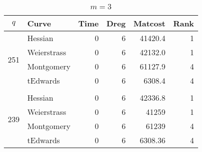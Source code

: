 
\begin{table}[!h]
\centering
\caption{$m=3$}
\label{tb:m=3}
\begin{tabular}{llrrrr}
\hline
\multicolumn{1}{|c|}{$q$}                    & \multicolumn{1}{l|}{Curve}       & \multicolumn{1}{l|}{Time} & \multicolumn{1}{l|}{Dreg} & \multicolumn{1}{l|}{Matcost} & \multicolumn{1}{l|}{Rank} \\ \hline
\multicolumn{1}{|l|}{\multirow{4}{*}{251}} & \multicolumn{1}{l|}{Hessian}     & \multicolumn{1}{r|}{0}    & \multicolumn{1}{r|}{6}    & \multicolumn{1}{r|}{41420.4} & \multicolumn{1}{r|}{1}    \\ \cline{2-6} 
\multicolumn{1}{|l|}{}                     & \multicolumn{1}{l|}{Weierstrass} & \multicolumn{1}{r|}{0}    & \multicolumn{1}{r|}{6}    & \multicolumn{1}{r|}{42132.0} & \multicolumn{1}{r|}{1}    \\ \cline{2-6} 
\multicolumn{1}{|l|}{}                     & \multicolumn{1}{l|}{Montgomery}  & \multicolumn{1}{r|}{0}    & \multicolumn{1}{r|}{6}    & \multicolumn{1}{r|}{61127.9} & \multicolumn{1}{r|}{4}    \\ \cline{2-6} 
\multicolumn{1}{|l|}{}                     & \multicolumn{1}{l|}{tEdwards}    & \multicolumn{1}{r|}{0}    & \multicolumn{1}{r|}{6}    & \multicolumn{1}{r|}{6308.4}  & \multicolumn{1}{r|}{4}    \\ \hline \vspace{-3mm}
                                           &                                  & \multicolumn{1}{l}{}      & \multicolumn{1}{l}{}      & \multicolumn{1}{l}{}         & \multicolumn{1}{l}{}      \\ \hline
\multicolumn{1}{|l|}{\multirow{4}{*}{239}} & \multicolumn{1}{l|}{Hessian}     & \multicolumn{1}{r|}{0}    & \multicolumn{1}{r|}{6}    & \multicolumn{1}{r|}{42336.8} & \multicolumn{1}{r|}{1}    \\ \cline{2-6} 
\multicolumn{1}{|l|}{}                     & \multicolumn{1}{l|}{Weierstrass} & \multicolumn{1}{r|}{0}    & \multicolumn{1}{r|}{6}    & \multicolumn{1}{r|}{41259}   & \multicolumn{1}{r|}{1}    \\ \cline{2-6} 
\multicolumn{1}{|l|}{}                     & \multicolumn{1}{l|}{Montgomery}  & \multicolumn{1}{r|}{0}    & \multicolumn{1}{r|}{6}    & \multicolumn{1}{r|}{61239}   & \multicolumn{1}{r|}{4}    \\ \cline{2-6} 
\multicolumn{1}{|l|}{}                     & \multicolumn{1}{l|}{tEdwards}    & \multicolumn{1}{r|}{0}    & \multicolumn{1}{r|}{6}    & \multicolumn{1}{r|}{6308.36} & \multicolumn{1}{r|}{4}    \\ \hline
\end{tabular}
\end{table}

